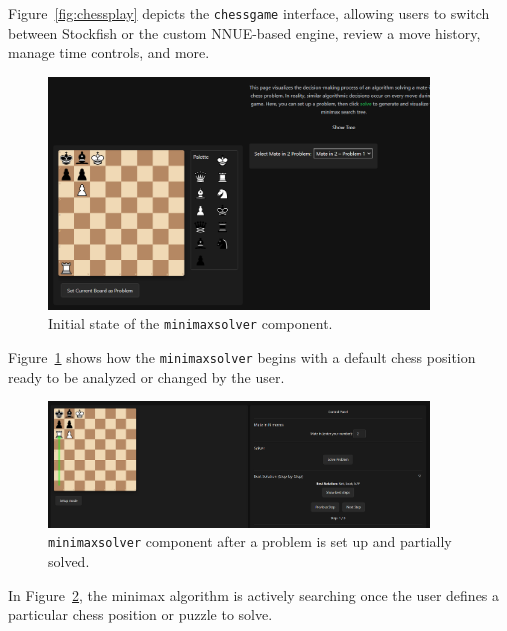 \documentclass[12pt,a4paper]{article}
\begin{document}
\noindent
Figure~\ref{fig:chessplay} depicts the \texttt{chessgame} interface, 
allowing users to switch between Stockfish or the custom NNUE-based engine, 
review a move history, manage time controls, and more.

\FloatBarrier
\begin{figure}[htbp]
  \centering
  \includegraphics[width=0.9\textwidth]{figures/Minimaxpageinitial.png}
  \caption{Initial state of the \texttt{minimaxsolver} component.}
  \label{fig:minimaxinitial}
\end{figure}

\noindent
Figure~\ref{fig:minimaxinitial} shows how the \texttt{minimaxsolver} begins 
with a default chess position ready to be analyzed or changed by the user.

\FloatBarrier
\begin{figure}[htbp]
  \centering
  \includegraphics[width=0.9\textwidth]{figures/Minimaxafterplay.png}
  \caption{\texttt{minimaxsolver} component after a problem is set up and partially solved.}
  \label{fig:Minimaxafterplay}
\end{figure}

\noindent
In Figure~\ref{fig:Minimaxafterplay}, the minimax algorithm is actively searching 
once the user defines a particular chess position or puzzle to solve.
\end{document}
